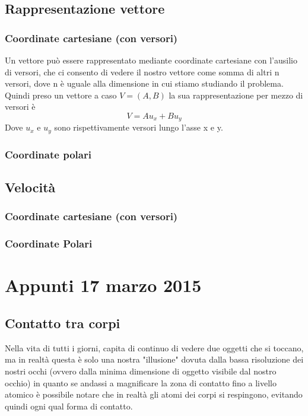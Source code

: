 \documentclass[portait]{article}
\begin{document}
\subsection{Rappresentazione vettore}
\subsubsection{Coordinate cartesiane (con versori)}
Un vettore può essere rappresentato mediante coordinate cartesiane con l'ausilio di versori, che ci consento di vedere il nostro vettore come somma di altri n versori, dove n è uguale alla dimensione in cui stiamo studiando il problema. Quindi preso un vettore a caso $V = (A,B)$ la sua rappresentazione per mezzo di versori è 
$$V = Au_x + Bu_y$$
Dove $u_x$ e $u_y$ sono rispettivamente versori lungo l'asse x e y.
\subsubsection{Coordinate polari}
\subsection{Velocità}
\subsubsection{Coordinate cartesiane (con versori)}
\subsubsection{Coordinate Polari}
\section{Appunti 17 marzo 2015}
\subsection{Contatto tra corpi}
Nella vita di tutti i giorni, capita di continuo di vedere due oggetti che si toccano, ma in realtà questa è solo una nostra "illusione" dovuta dalla bassa risoluzione dei nostri occhi (ovvero dalla minima dimensione di oggetto visibile dal nostro occhio) in quanto se andassi a magnificare la zona di contatto fino a livello atomico è possibile notare che in realtà gli atomi dei corpi si respingono, evitando quindi ogni qual forma di contatto.
\end{document}
